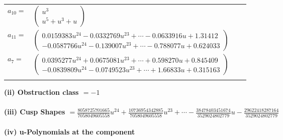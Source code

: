 \documentclass[1p]{elsarticle_modified}
\theoremstyle{definition}
\begin{document}
\begin{tabular}{m{7pt} m{180pt} m{7pt} m{180pt} }
\flushright $a_{10}=$&$\begin{pmatrix}u^3\\u^5+u^3+u\end{pmatrix}$ \\
\flushright $a_{11}=$&$\begin{pmatrix}0.0159383 u^{24}-0.0332769 u^{23}+\cdots-0.0633916 u+1.31412\\-0.0587766 u^{24}-0.139007 u^{23}+\cdots-0.788077 u+0.624033\end{pmatrix}$ \\
\flushright $a_{7}=$&$\begin{pmatrix}0.0395277 u^{24}+0.0675081 u^{23}+\cdots+0.598270 u+0.845409\\-0.0839809 u^{24}-0.0749523 u^{23}+\cdots+1.66833 u+0.315163\end{pmatrix}$\\&\end{tabular}
\flushleft \textbf{(ii) Obstruction class $= -1$}\\~\\
\flushleft \textbf{(iii) Cusp Shapes $= \frac{8058725701665}{7058049605558} u^{24}+\frac{10736954342885}{7058049605558} u^{23}+\cdots-\frac{38478403451674}{3529024802779} u-\frac{29622418287164}{3529024802779}$}\\~\\
\newpage\renewcommand{\arraystretch}{1}
\flushleft \textbf{(iv) u-Polynomials at the component}\newline \\
\end{document}
